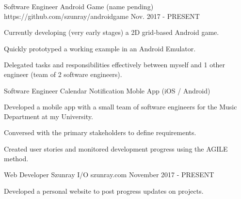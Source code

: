 


\begin{cventries}


\cventry
{Software Engineer} %
{Android Game (name pending)} %
{https://github.com/szunray/androidgame} %
{Nov. 2017 - PRESENT} %
{ %
\begin{cvitems}
\item {Currently developing (very early stages) a 2D grid-based Android game.}
\item {Quickly prototyped a working example in an Android Emulator.}
\item {Delegated tasks and responsibilities effectively between myself and 1 other engineer (team of 2 software engineers).}
\end{cvitems}
}


\cventry
{Software Engineer} %
{Calendar Notification Moble App (iOS / Android)} %
{} %
{} %
{ %
\begin{cvitems}
\item {Developed a mobile app with a small team of software engineers for the Music Department at my University.} 
\item {Conversed with the primary stakeholders to define requirements.} 
\item {Created user stories and monitored development progress using the AGILE method.} 
\end{cvitems}
}


\cventry
{Web Developer} %
{Szunray I/O} %
{szunray.com} %
{November 2017 - PRESENT} %
{ %
\begin{cvitems}
\item {Developed a personal website to post progress updates on projects.} 
\end{cvitems}
}


\end{cventries}
